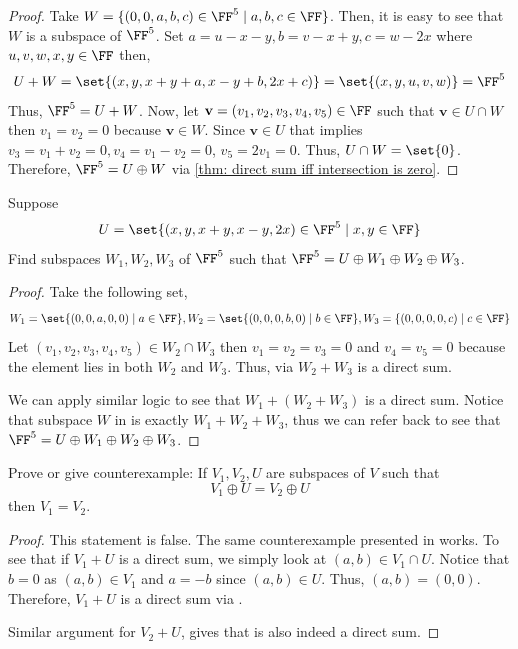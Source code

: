 \begin{proof}
    Take $W= \{(0,0,a,b,c) \in \FF^5 \mid a,b,c \in \FF\}$. Then, it is easy to see that $W$ is a subspace of $\FF^5$. 
    Set $a=u-x-y,b=v-x+y,c=w-2x$ where $u,v,w,x,y \in \FF$ then,
    \[ U+W = \set{(x,y,x+y+a,x-y+b,2x+c)} = \set{(x,y,u,v,w)} = \FF^5 \]
    Thus, $\FF^5 = U + W$.   
    Now, let $\mathbf{v}= (v_1,v_2,v_3,v_4,v_5) \in \FF$ such that $\mathbf{v} \in U \cap W$ then $v_1=v_2=0$ because $\mathbf{v} \in W$.
    Since $\mathbf{v} \in U$ that implies \mbox{$v_3= v_1+v_2= 0, v_4 =  v_1-v_2 = 0$}, $v_5=2v_1=0$.
    Thus, $U \cap W = \set{0}$. Therefore, $\FF^5 = U \oplus W$ via \cref{thm: direct sum iff intersection is zero}.
\end{proof}

\begin{exercise}
    Suppose
    \[ U = \set{(x,y,x+y,x-y,2x) \in \FF^5 \mid x,y \in \FF} \]
    Find subspaces $W_1,W_2,W_3$ of $\FF^5$ such that $\FF^5 = U \oplus W_1 \oplus W_2 \oplus W_3$.
\end{exercise}

\begin{proof}
    Take the following set,
    \[ W_1 = \set{(0,0,a,0,0) \mid a \in \FF}, W_2 = \set{(0,0,0,b,0) \mid b \in \FF }, W_3=\{(0,0,0,0,c) \mid c \in \FF \} \]
    Let $(v_1,v_2,v_3,v_4,v_5) \in W_2 \cap W_3$ then $v_1=v_2=v_3=0$ and $v_4=v_5=0$ because 
    the element lies in both $W_2$ and $W_3$. Thus, via  $W_2+W_3$ is a direct sum.

    We can apply similar logic to see that $W_1 + (W_2+W_3)$ is a direct sum. Notice that subspace $W$ in  is exactly $W_1 + W_2 + W_3$, thus we can refer back to see that $\FF^5 = U \oplus W_1 \oplus W_2 \oplus W_3$.
\end{proof}

\begin{exercise}
    Prove or give counterexample: If $V_1,V_2,U$ are subspaces of $V$ such that 
    \[ V_1 \oplus U = V_2 \oplus U \]
    then $V_1 = V_2$.
\end{exercise}

\begin{proof}
    This statement is false. The same counterexample presented in  works. To see that if $V_1+U$ is a direct sum,
    we simply look at $(a,b) \in V_1 \cap U$. Notice that $b = 0$ as $(a,b) \in V_1$ and $a=-b$ since $(a,b) \in U$. Thus, $(a,b)=(0,0)$.
    Therefore, $V_1 + U$ is a direct sum via .

    Similar argument for $V_2 + U$, gives that is also indeed a direct sum.
\end{proof}

